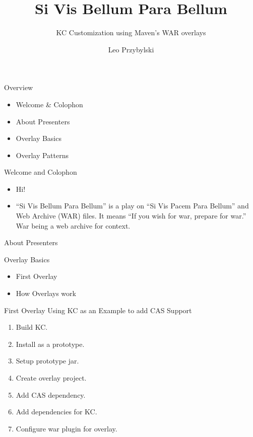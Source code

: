 \documentclass[xcolor=dvipsnames,14pt]{beamer}
\begin{document}
\title{Si Vis Bellum Para Bellum}
\subtitle{KC Customization using Maven's WAR overlays}
\author[Leo]{Leo Przybylski}


\begin{frame}[plain]
  \titlepage
\end{frame}

\begin{frame}{Overview}
  \begin{itemize}
  \item Welcome \& Colophon
  \item About Presenters
  \item Overlay Basics
  \item Overlay Patterns
  \end{itemize}
\end{frame}

\begin{frame}{Welcome and Colophon}
  \begin{itemize}
    \item Hi!
    \item ``Si Vis Bellum Para Bellum'' is a play on ``Si Vis Pacem
      Para Bellum'' and Web Archive (WAR) files. It means ``If you
      wish for war, prepare for war.'' War being a web archive for context.
  \end{itemize}
\end{frame}

\begin{frame}{About Presenters}
\end{frame}

\begin{frame}{Overlay Basics}
  \begin{itemize}
  \item First Overlay
  \item How Overlays work
  \end{itemize}
\end{frame}

\begin{frame}{First Overlay}
  Using KC as an Example to add CAS Support
  \begin{enumerate}
    \item Build KC.
    \item Install as a prototype.
    \item Setup prototype jar.
    \item Create overlay project.
    \item Add CAS dependency.
    \item Add dependencies for KC.
    \item Configure war plugin for overlay.
  \end{enumerate}
\end{frame}
\end{document}
